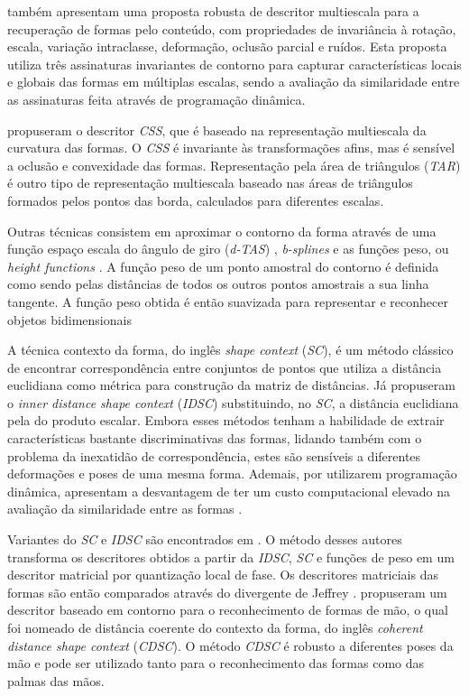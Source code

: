  também apresentam uma proposta robusta de descritor multiescala para a recuperação de formas pelo conteúdo, com propriedades de invariância à rotação, escala, variação intraclasse, deformação,  oclusão parcial e ruídos. Esta proposta utiliza três assinaturas invariantes de contorno para capturar características locais e globais das formas em múltiplas escalas, sendo a avaliação da similaridade entre as assinaturas feita através de programação dinâmica.


 propuseram o descritor \textit{CSS}, que é baseado na representação multiescala da curvatura das formas. O \textit{CSS} é invariante às transformações afins, mas é sensível a oclusão e convexidade das formas. Representação pela área de triângulos (\textit{TAR}) \cite{Alajlan20117} é outro tipo de representação multiescala baseado nas áreas de triângulos formados pelos pontos das borda, calculados para diferentes escalas. 

Outras técnicas consistem em aproximar o contorno da forma através de uma função espaço escala do ângulo de giro (\textit{d-TAS}) \cite{4202050}, \textit{b-splines} \cite{1168520} e as funções peso, ou \textit{height functions} \cite{Wang2012134}. A função peso de um ponto amostral do contorno é definida como sendo pelas distâncias de todos os outros pontos amostrais a sua linha tangente. A função peso obtida é então suavizada para representar e reconhecer objetos bidimensionais

A técnica contexto da forma, do inglês \textit{shape context} (\textit{SC}), \cite{Belongie:2002} é um método clássico de encontrar correspondência entre conjuntos de pontos que utiliza a distância euclidiana como métrica para construção da matriz de distâncias. Já  propuseram o \textit{inner distance shape context} (\textit{IDSC}) substituindo, no \textit{SC}, a distância euclidiana pela do produto escalar. Embora esses métodos tenham a habilidade de extrair características bastante discriminativas das formas, lidando também com o problema da inexatidão de correspondência, estes são sensíveis a diferentes deformações e poses de uma mesma forma. Ademais, por utilizarem programação dinâmica, apresentam a desvantagem de ter um custo computacional elevado na avaliação da similaridade entre as formas \cite{FreitasS.TorresMiranda2016}.

Variantes do \textit{SC} e \textit{IDSC} são encontrados em \cite{Nanni20122254}. O método desses autores transforma os descritores obtidos a partir da \textit{IDSC}, \textit{SC} e funções de peso em um descritor matricial por quantização local de fase. Os descritores matriciais das formas são então comparados através do divergente de Jeffrey \cite{Ullah1996}.  propuseram um descritor baseado em contorno para o reconhecimento de formas de mão, o qual foi nomeado de distância coerente do contexto da forma, do inglês \textit{coherent distance shape context} (\textit{CDSC}). O método \textit{CDSC} é robusto a diferentes poses da mão e pode ser utilizado tanto para o reconhecimento das formas como das palmas das mãos.  


